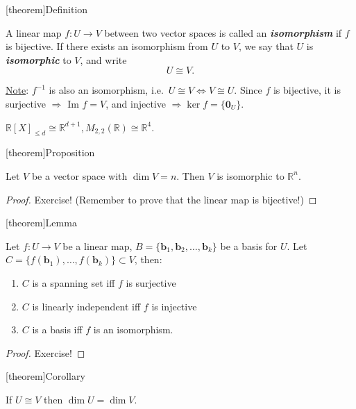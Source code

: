 \documentclass[12pt]{report}
\theoremstyle{definition}
\begin{document}
[theorem]{Definition}
\begin{isomorphism}
    A linear map $f:U\rightarrow{}V$ between two vector spaces is called an \textbf{\emph{isomorphism}}
    if $f$ is bijective.
    If there exists an isomorphism from $U$ to $V$,
    we say that $U$ is \textbf{\emph{isomorphic}} to $V$, and write\[
        U \cong V.
    \]
\end{isomorphism}

\underline{Note}: $f^{-1}$ is also an isomorphism, i.e.\ $U \cong V \iff V \cong U$.
Since $f$ is bijective, it is surjective $\Rightarrow{}$ Im $f = V$,
and injective $\Rightarrow{} \ker{f} = \{\pmb{0}_U\}$.

\begin{ex}
    $\mathbb{R}{[X]}_{\le d} \cong \mathbb{R}^{d+1}, M_{2, 2}(\mathbb{R}) \cong \mathbb{R}^{4}$.
\end{ex}

[theorem]{Proposition}
\begin{isomorphic to Rn}
    Let $V$ be a vector space with $\dim{V} = n$.
    Then $V$ is isomorphic to $\mathbb{R}^{n}$.
\end{isomorphic to Rn}

\begin{proof}
    Exercise! (Remember to prove that the linear map is bijective!)
\end{proof}

[theorem]{Lemma}
\begin{C is basis iif f is isomorphism}
    Let $f:U\rightarrow{}V$ be a linear map, $B=\{\pmb{b}_1, \pmb{b}_2,\ldots,\pmb{b}_k\}$
    be a basis for $U$. Let $C = \{f(\pmb{b}_1),\ldots,f(\pmb{b}_k)\} \subset V$, then:
    \begin{enumerate}[label = (\roman*)]
        \item $C$ is a spanning set iff $f$ is surjective
        \item $C$ is linearly independent iff $f$ is injective
        \item $C$ is a basis iff $f$ is an isomorphism.
    \end{enumerate}
\end{C is basis iif f is isomorphism}

\begin{proof}
    Exercise!
\end{proof}

[theorem]{Corollary}
\begin{isomorphic vector spaces have the same dimension}
    If $U \cong V$ then $\dim{U} = \dim{V}$.
\end{isomorphic vector spaces have the same dimension}
\end{document}

